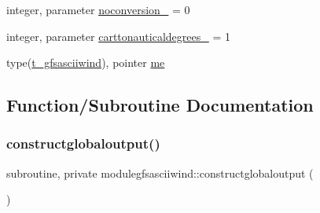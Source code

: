 \begin{DoxyCompactItemize}
\item 
integer, parameter \mbox{\hyperlink{namespacemodulegfsasciiwind_af0862756eafdf97c8c8176091c7b87e8}{noconversion\+\_\+}} = 0
\item 
integer, parameter \mbox{\hyperlink{namespacemodulegfsasciiwind_a0a6e81b60bce37217f1aa7c7cb238e61}{carttonauticaldegrees\+\_\+}} = 1
\item 
type(\mbox{\hyperlink{structmodulegfsasciiwind_1_1t__gfsasciiwind}{t\+\_\+gfsasciiwind}}), pointer \mbox{\hyperlink{namespacemodulegfsasciiwind_ae4f2c81a144ab1609763f342a186c40d}{me}}
\end{DoxyCompactItemize}


\subsection{Function/\+Subroutine Documentation}
\mbox{\label{namespacemodulegfsasciiwind_a138e1d55d83fe4bc5ba1901ae3adcbb7}} 
\subsubsection{\texorpdfstring{constructglobaloutput()}{constructglobaloutput()}}
{\footnotesize\ttfamily subroutine, private modulegfsasciiwind\+::constructglobaloutput (\begin{DoxyParamCaption}{ }\end{DoxyParamCaption})\hspace{0.3cm}{\ttfamily [private]}}


